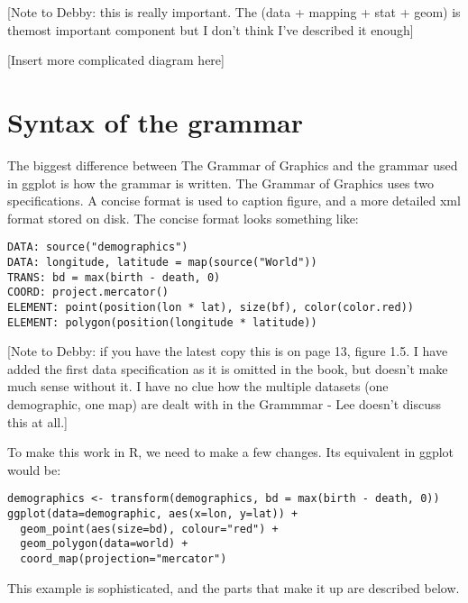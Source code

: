 [Note to Debby: this is really important.  The (data + mapping + stat + geom) is themost important component but I don't think I've described it enough]

[Insert more complicated diagram here]

\section{Syntax of the grammar}

The biggest difference between The Grammar of Graphics and the grammar used in ggplot is how the grammar is written.  The Grammar of Graphics uses two specifications.  A concise format is used to caption figure, and a more detailed xml format stored on disk.  The concise format looks something like:

\begin{verbatim}
DATA: source("demographics")
DATA: longitude, latitude = map(source("World"))
TRANS: bd = max(birth - death, 0)
COORD: project.mercator()
ELEMENT: point(position(lon * lat), size(bf), color(color.red))
ELEMENT: polygon(position(longitude * latitude))
\end{verbatim}

[Note to Debby: if you have the latest copy this is on page 13, figure 1.5.  I have added the first data specification as it is omitted in the book, but doesn't make much sense without it.  I have no clue how the multiple datasets (one demographic, one map) are dealt with in the Grammmar - Lee doesn't discuss this at all.]

To make this work in R, we need to make a few changes.  Its equivalent in ggplot would be:

\begin{verbatim}
demographics <- transform(demographics, bd = max(birth - death, 0))
ggplot(data=demographic, aes(x=lon, y=lat)) + 
  geom_point(aes(size=bd), colour="red") +
  geom_polygon(data=world) +
  coord_map(projection="mercator")
\end{verbatim}

\noindent This example is sophisticated, and the parts that make it up are described below.

